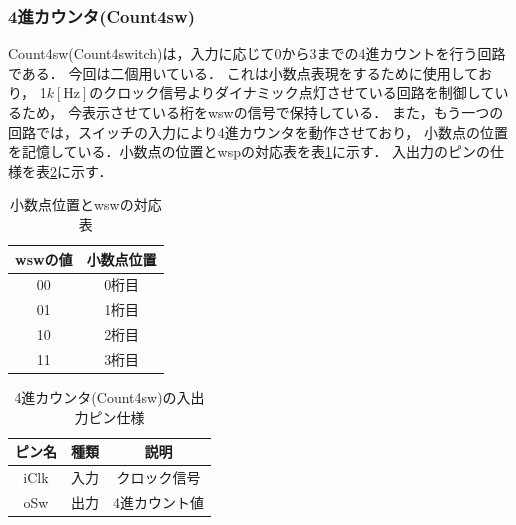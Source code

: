 \documentclass[a4paper,11pt]{ltjsarticle}
\begin{document}
\subsubsection{4進カウンタ(Count4sw)}
Count4sw(Count4switch)は，入力に応じて0から3までの4進カウントを行う回路である．
今回は二個用いている．
これは小数点表現をするために使用しており，
1$k[\text{Hz}]$のクロック信号よりダイナミック点灯させている回路を制御しているため，
今表示させている桁をwswの信号で保持している．
また，もう一つの回路では，スイッチの入力により4進カウンタを動作させており，
小数点の位置を記憶している．小数点の位置とwspの対応表を表\ref{tab:wsw}に示す．
入出力のピンの仕様を表\ref{tab:count4sw}に示す．
\begin{table}[H]
    \centering
    \caption{小数点位置とwswの対応表}
    \label{tab:wsw}
    \begin{tabular}{|c|c|}
        \hline
        wswの値 & 小数点位置 \\
        \hline
        00    & 0桁目   \\
        \hline
        01    & 1桁目   \\
        \hline
        10    & 2桁目   \\
        \hline
        11    & 3桁目   \\
        \hline
    \end{tabular}
\end{table}
\begin{table}[H]
    \centering
    \caption{4進カウンタ(Count4sw)の入出力ピン仕様}
    \label{tab:count4sw}
    \begin{tabular}{|c|c|c|}
        \hline
        ピン名  & 種類 & 説明      \\
        \hline
        iClk & 入力 & クロック信号  \\
        \hline
        oSw  & 出力 & 4進カウント値 \\
        \hline
    \end{tabular}
\end{table}
\end{document}
